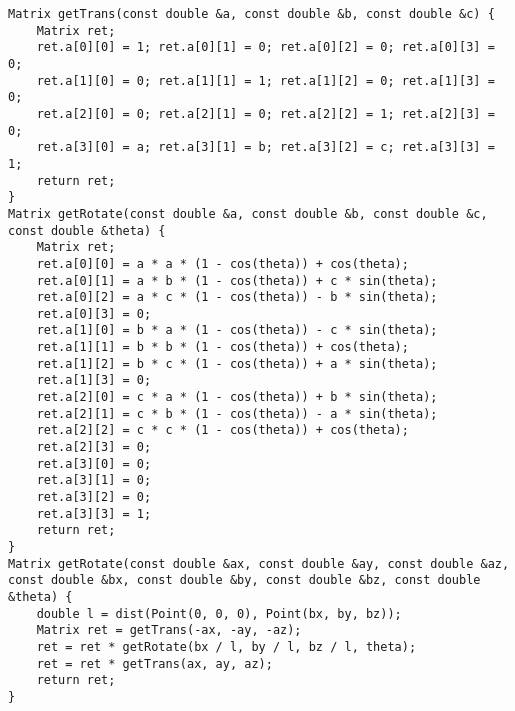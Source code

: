 \begin{lstlisting}
Matrix getTrans(const double &a, const double &b, const double &c) {
    Matrix ret;
    ret.a[0][0] = 1; ret.a[0][1] = 0; ret.a[0][2] = 0; ret.a[0][3] = 0;
    ret.a[1][0] = 0; ret.a[1][1] = 1; ret.a[1][2] = 0; ret.a[1][3] = 0;
    ret.a[2][0] = 0; ret.a[2][1] = 0; ret.a[2][2] = 1; ret.a[2][3] = 0;
    ret.a[3][0] = a; ret.a[3][1] = b; ret.a[3][2] = c; ret.a[3][3] = 1;
    return ret;
}
Matrix getRotate(const double &a, const double &b, const double &c, const double &theta) {
    Matrix ret;
    ret.a[0][0] = a * a * (1 - cos(theta)) + cos(theta);
    ret.a[0][1] = a * b * (1 - cos(theta)) + c * sin(theta);
    ret.a[0][2] = a * c * (1 - cos(theta)) - b * sin(theta);
    ret.a[0][3] = 0;
    ret.a[1][0] = b * a * (1 - cos(theta)) - c * sin(theta);
    ret.a[1][1] = b * b * (1 - cos(theta)) + cos(theta);
    ret.a[1][2] = b * c * (1 - cos(theta)) + a * sin(theta);
    ret.a[1][3] = 0;
    ret.a[2][0] = c * a * (1 - cos(theta)) + b * sin(theta);
    ret.a[2][1] = c * b * (1 - cos(theta)) - a * sin(theta);
    ret.a[2][2] = c * c * (1 - cos(theta)) + cos(theta);
    ret.a[2][3] = 0;
    ret.a[3][0] = 0;
    ret.a[3][1] = 0;
    ret.a[3][2] = 0;
    ret.a[3][3] = 1;
    return ret;
}
Matrix getRotate(const double &ax, const double &ay, const double &az, const double &bx, const double &by, const double &bz, const double &theta) {
    double l = dist(Point(0, 0, 0), Point(bx, by, bz));
    Matrix ret = getTrans(-ax, -ay, -az);
    ret = ret * getRotate(bx / l, by / l, bz / l, theta);
    ret = ret * getTrans(ax, ay, az);
    return ret;
}
\end{lstlisting}
